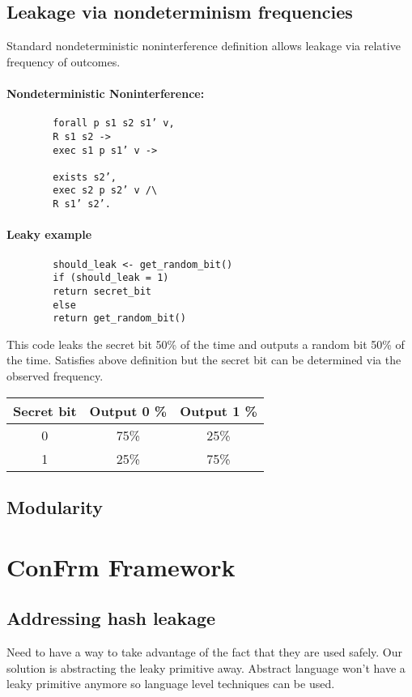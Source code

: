 \documentclass[onecolumn]{paper}
\begin{document}
	\subsection{Leakage via nondeterminism frequencies}	
	Standard nondeterministic noninterference definition allows leakage via relative frequency of outcomes.
	\paragraph{Nondeterministic Noninterference:}
	
	\begin{verbatim}
		forall p s1 s2 s1’ v,
		R s1 s2 ->
		exec s1 p s1’ v ->
		
		exists s2’,
		exec s2 p s2’ v /\
		R s1’ s2’.
	\end{verbatim} 
	
	
	
	\paragraph*{Leaky example}
	\begin{verbatim}
		should_leak <- get_random_bit()
		if (should_leak = 1)
		return secret_bit
		else
		return get_random_bit()
	\end{verbatim}
	
	This code leaks the secret bit 50\% of the time and outputs a random bit 50\% of the time.
	Satisfies above definition but the secret bit can be determined via the observed frequency.
	
	\begin{tabular}{| c | c | c |}
		\hline
		Secret bit & Output 0 \% & Output 1 \% \\
		\hline
		0 &	75\% & 25\% \\
		\hline
		1 &	25\% & 75\% \\
		\hline
		\end{tabular}
	
	\subsection{Modularity}
\newpage
\section{ConFrm Framework}
	\subsection{Addressing hash leakage}
	Need to have a way to take advantage of the fact that they are used safely.
	Our solution is abstracting the leaky primitive away.
	Abstract language won’t have a leaky primitive anymore so language level techniques can be used.
	
\end{document}
